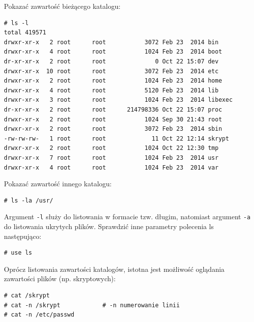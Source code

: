\begin{example}\label{ex:wylistowanie}

Pokazać zawartość bieżącego katalogu:

\begin{lstlisting}[style=MyBashStyle]
# ls -l
total 419571
drwxr-xr-x   2 root      root           3072 Feb 23  2014 bin
drwxr-xr-x   4 root      root           1024 Feb 23  2014 boot
dr-xr-xr-x   2 root      root              0 Oct 22 15:07 dev
drwxr-xr-x  10 root      root           3072 Feb 23  2014 etc
drwxr-xr-x   2 root      root           1024 Feb 23  2014 home
drwxr-xr-x   4 root      root           5120 Feb 23  2014 lib
drwxr-xr-x   3 root      root           1024 Feb 23  2014 libexec
dr-xr-xr-x   2 root      root      214798336 Oct 22 15:07 proc
drwxr-xr-x   2 root      root           1024 Sep 30 21:43 root
drwxr-xr-x   2 root      root           3072 Feb 23  2014 sbin
-rw-rw-rw-   1 root      root             11 Oct 22 12:14 skrypt
drwxr-xr-x   2 root      root           1024 Oct 22 12:30 tmp
drwxr-xr-x   7 root      root           1024 Feb 23  2014 usr
drwxr-xr-x   4 root      root           1024 Feb 23  2014 var
\end{lstlisting}

Pokazać zawartość innego katalogu:

\begin{lstlisting}[style=MyBashStyle]
# ls -la /usr/
\end{lstlisting}

Argument \lstinline[style=MyBashStyle]{-l} służy do listowania w formacie tzw. długim, natomiast argument \lstinline[style=MyBashStyle]{-a} do listowania ukrytych plików. Sprawdzić inne parametry polecenia ls następująco:

\begin{lstlisting}[style=MyBashStyle]
# use ls
\end{lstlisting}
\end{example}

\begin{example}\label{ex:obejrzenie}

Oprócz listowania zawartości katalogów, istotna jest możliwość oglądania zawartości plików (np. skryptowych):

\begin{lstlisting}[style=MyBashStyle]
# cat /skrypt
# cat -n /skrypt			# -n numerowanie linii
# cat -n /etc/passwd
\end{lstlisting}
\end{example}


